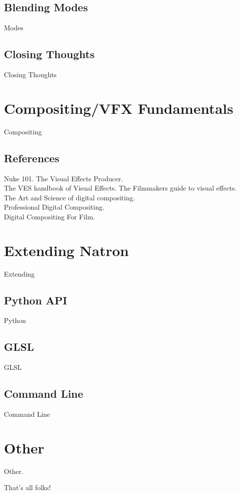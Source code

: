 \documentclass[10pt,oneside,openany,letterpaper]{memoir}
\begin{document}
\chapter{Blending Modes}
Modes

\chapter{Closing Thoughts}
Closing Thoughts


\part{Compositing/VFX Fundamentals}

Compositing

\chapter{References}
Nuke 101. The Visual Effects Producer. \\
The VES handbook of Visual Effects. The Filmmakers guide to visual effects. \\
The Art and Science of digital compositing. \\
Professional Digital Compositing. \\
Digital Compositing For Film.


\part{ Extending Natron}
Extending

\chapter{Python API}
Python

\chapter{GLSL}
GLSL

\chapter{Command Line}
Command Line



\part{Other}
Other.




That's all folks!
\end{document}
